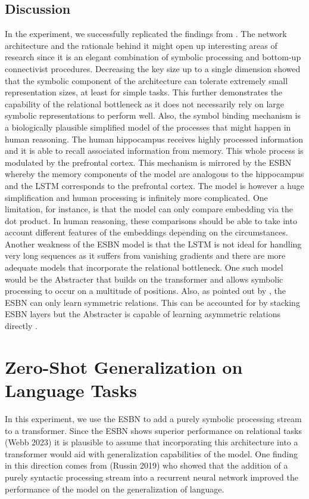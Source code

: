 \subsection{Discussion}
In the experiment, we successfully replicated the findings from \textcite{webb_emergent_2021}. The network architecture and the rationale behind it might open up interesting areas of research since it is an elegant combination of symbolic processing and bottom-up connectivist procedures. \newline
Decreasing the key size up to a single dimension showed that the symbolic component of the architecture can tolerate extremely small representation sizes, at least for simple tasks. This further demonstrates the capability of the relational bottleneck as it does not necessarily rely on large symbolic representations to perform well. \newline
Also, the symbol binding mechanism is a biologically plausible simplified model of the processes that might happen in human reasoning. The human hippocampus receives highly processed information and it is able to recall associated information from memory. This whole process is modulated by the prefrontal cortex. This mechanism is mirrored by the ESBN whereby the memory components of the model are analogous to the hippocampus and the LSTM corresponds to the prefrontal cortex.
The model is however a huge simplification and human processing is infinitely more complicated. One limitation, for instance, is that the model can only compare embedding via the dot product. In human reasoning, these comparisons should be able to take into account different features of the embeddings depending on the circumstances.\newline
Another weakness of the ESBN model is that the LSTM is not ideal for handling very long sequences as it suffers from vanishing gradients and there are more adequate models that incorporate the relational bottleneck. One such model would be the Abstracter \textcite{altabaa_abstractors_2023} that builds on the transformer and allows symbolic processing to occur on a multitude of positions. \newline
Also, as pointed out by \textcite{webb_relational_2023}, the ESBN can only learn symmetric relations. This can be accounted for by stacking ESBN layers but the Abstracter \textcite{altabaa_abstractors_2023} is capable of learning asymmetric relations directly \textcite{webb_relational_2023}.


\section{Zero-Shot Generalization on Language Tasks}
In this experiment, we use the ESBN to add a purely symbolic processing stream to a transformer. Since the ESBN shows superior performance on relational tasks (Webb 2023) it is plausible to assume that incorporating this architecture into a transformer would aid with generalization capabilities of the model. \newline
One finding in this direction comes from (Russin 2019) who showed that the addition of a purely syntactic processing stream into a recurrent neural network improved the performance of the model on the generalization of language. 

